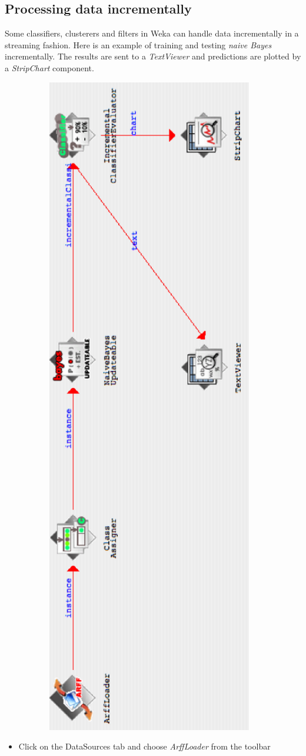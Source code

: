 
\newpage
\subsection{Processing data incrementally}

Some classifiers, clusterers and filters in Weka can handle data incrementally
in a streaming fashion. Here is an example of training and testing \textit{naive Bayes}
incrementally. The results are sent to a \textit{TextViewer} and predictions are plotted
by a \textit{StripChart} component.

\begin{center}
  \includegraphics[angle=270,width=13cm]{images/knowledgeflow/IncrementalFlow.eps}
\end{center}

\begin{itemize}
        \item Click on the DataSources tab and choose \textit{ArffLoader} from the
	toolbar 
\end{itemize}
